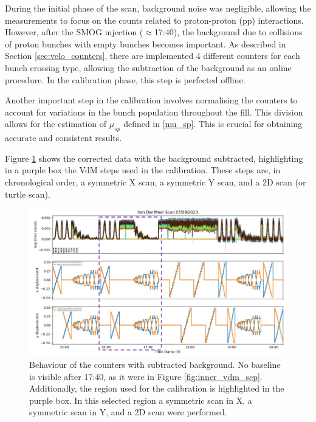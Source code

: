 During the initial phase of the scan, background noise was negligible, allowing the measurements to focus on the counts related to proton-proton (pp) interactions. However, after the SMOG injection ($\approx$17:40), the background due to collisions of proton bunches with empty bunches becomes important. As described in Section \ref{sec:velo_counters}, there are implemented 4 different counters for each bunch crossing type, allowing the subtraction of the background as an online procedure. In the calibration phase, this step is perfected offline. 

Another important step in the calibration involves normalising the counters to account for variations in the bunch population throughout the fill. This division allows for the estimation of $\mu_{sp}$ defined in \eqref{mu_sp}. This is crucial for obtaining accurate and consistent results.

Figure \ref{fig:bkg_sub_calib} shows the corrected data with the background subtracted, highlighting in a purple box the VdM steps used in the calibration. These steps are, in chronological order, a symmetric X scan, a symmetric Y scan, and a 2D scan (or turtle scan). 

\begin{figure}
    \centering
    \includegraphics[width=\textwidth]{figures/calibration_period.png}
    \caption{Behaviour of the counters with subtracted background. No baseline is visible after 17:40, as it were in Figure \ref{fig:inner_vdm_sep}. Additionally, the region used for the calibration is highlighted in the purple box. In this selected region a symmetric scan in X, a symmetric scan in Y, and a 2D scan were performed.}
    \label{fig:bkg_sub_calib}
\end{figure}

